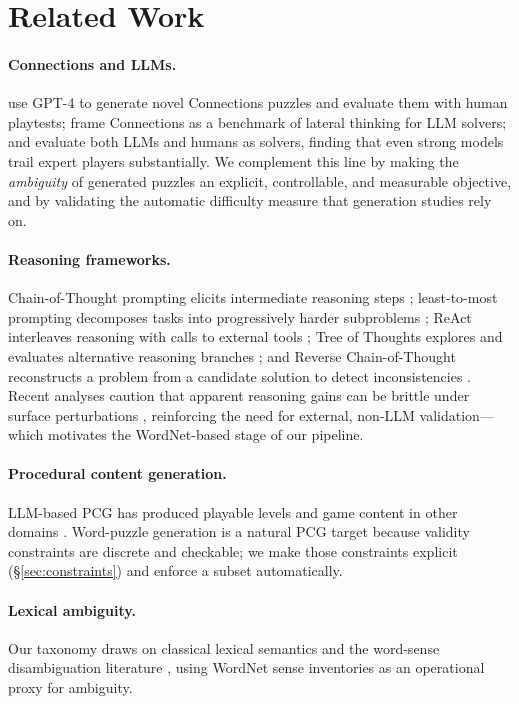 \documentclass[11pt]{article}
\begin{document}
\section{Related Work}

\paragraph{Connections and LLMs.}
\citet{merino2024making} use GPT-4 to generate novel Connections puzzles and evaluate them with human playtests; \citet{todd2024missed} frame Connections as a benchmark of lateral thinking for LLM solvers; and \citet{samadarshi2024connecting} evaluate both LLMs and humans as solvers, finding that even strong models trail expert players substantially. We complement this line by making the \emph{ambiguity} of generated puzzles an explicit, controllable, and measurable objective, and by validating the automatic difficulty measure that generation studies rely on.

\paragraph{Reasoning frameworks.}
Chain-of-Thought prompting elicits intermediate reasoning steps \citep{wei2022chain}; least-to-most prompting decomposes tasks into progressively harder subproblems \citep{zhou2023least}; ReAct interleaves reasoning with calls to external tools \citep{yao2023react}; Tree of Thoughts explores and evaluates alternative reasoning branches \citep{yao2023tree}; and Reverse Chain-of-Thought reconstructs a problem from a candidate solution to detect inconsistencies \citep{xue2023rcot}. Recent analyses caution that apparent reasoning gains can be brittle under surface perturbations \citep{mirzadeh2024gsm}, reinforcing the need for external, non-LLM validation---which motivates the WordNet-based stage of our pipeline.

\paragraph{Procedural content generation.}
LLM-based PCG has produced playable levels and game content in other domains \citep{sudhakaran2023mariogpt}. Word-puzzle generation is a natural PCG target because validity constraints are discrete and checkable; we make those constraints explicit (\S\ref{sec:constraints}) and enforce a subset automatically.

\paragraph{Lexical ambiguity.}
Our taxonomy draws on classical lexical semantics \citep{cruse1986lexical} and the word-sense disambiguation literature \citep{navigli2009word}, using WordNet sense inventories \citep{miller1995wordnet, fellbaum1998wordnet} as an operational proxy for ambiguity.
\end{document}

